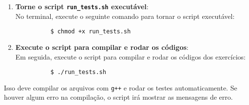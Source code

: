 \documentclass{article}
\begin{document}
\begin{enumerate}
	\item \textbf{Torne o script \texttt{run\_tests.sh} executável}: \\ No
	      terminal, execute o seguinte comando para tornar o script executável:
	      \begin{verbatim}
          $ chmod +x run_tests.sh
        \end{verbatim}

	\item \textbf{Execute o script para compilar e rodar os códigos}: \\ Em
	      seguida, execute o script para compilar e rodar os códigos dos exercícios:
	      \begin{verbatim}
          $ ./run_tests.sh
        \end{verbatim}
\end{enumerate}

Isso deve compilar os arquivos com \texttt{g++} e rodar os testes
automaticamente. Se houver algum erro na compilação, o script irá mostrar as
mensagens de erro.
\end{document}
